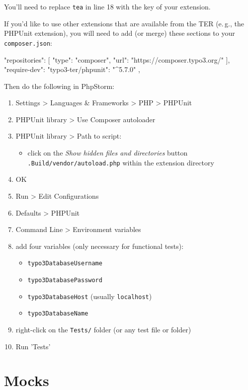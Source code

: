 \documentclass[a4paper,11pt,headsepline]{scrartcl}
\begin{document}
You'll need to replace \texttt{tea} in line 18 with the key of your extension.

If you'd like to use other extensions that are available from the TER (e.\,g., the PHPUnit extension), you will need to add (or merge) these sections to your \texttt{composer.json}:

\begin{jsoncode}
"repositories": [
{
  "type": "composer",
  "url": "https://composer.typo3.org/"
}
],
"require-dev": {
  "typo3-ter/phpunit": "^5.7.0"
},
\end{jsoncode}

Then do the following in PhpStorm:
\begin{enumerate}
  \item Settings > Languages \& Frameworks > PHP > PHPUnit
  \item PHPUnit library > Use Composer autoloader
  \item PHPUnit library > Path to script:
    \begin{itemize}
      \item click on the \emph{Show hidden files and directories} button
      \texttt{.Build/vendor/autoload.php} within the extension directory
    \end{itemize}
  \item OK
  \item Run > Edit Configurations
  \item Defaults > PHPUnit
  \item Command Line > Environment variables
  \item add four variables (only necessary for functional tests):
    \begin{itemize}
      \item \texttt{typo3DatabaseUsername}
      \item \texttt{typo3DatabasePassword}
      \item \texttt{typo3DatabaseHost} (usually \texttt{localhost})
      \item \texttt{typo3DatabaseName}
    \end{itemize}
  \item right-click on the \texttt{Tests/} folder (or any test file or folder)
  \item Run 'Tests'
\end{enumerate}



\pagebreak
\section{Mocks}
\end{document}
